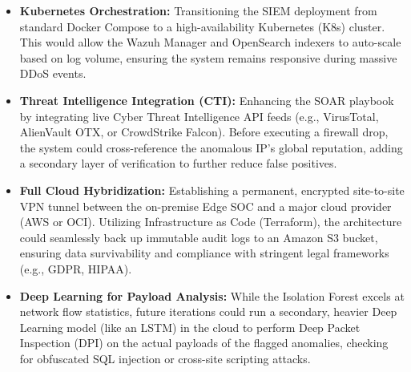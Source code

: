 \documentclass[12pt, a4paper]{report}
\begin{document}
	\begin{itemize}
		\item \textbf{Kubernetes Orchestration:} Transitioning the SIEM deployment from standard Docker Compose to a high-availability Kubernetes (K8s) cluster. This would allow the Wazuh Manager and OpenSearch indexers to auto-scale based on log volume, ensuring the system remains responsive during massive DDoS events.
		
		\item \textbf{Threat Intelligence Integration (CTI):} Enhancing the SOAR playbook by integrating live Cyber Threat Intelligence API feeds (e.g., VirusTotal, AlienVault OTX, or CrowdStrike Falcon). Before executing a firewall drop, the system could cross-reference the anomalous IP's global reputation, adding a secondary layer of verification to further reduce false positives.
		
		\item \textbf{Full Cloud Hybridization:} Establishing a permanent, encrypted site-to-site VPN tunnel between the on-premise Edge SOC and a major cloud provider (AWS or OCI). Utilizing Infrastructure as Code (Terraform), the architecture could seamlessly back up immutable audit logs to an Amazon S3 bucket, ensuring data survivability and compliance with stringent legal frameworks (e.g., GDPR, HIPAA).
		
		\item \textbf{Deep Learning for Payload Analysis:} While the Isolation Forest excels at network flow statistics, future iterations could run a secondary, heavier Deep Learning model (like an LSTM) in the cloud to perform Deep Packet Inspection (DPI) on the actual payloads of the flagged anomalies, checking for obfuscated SQL injection or cross-site scripting attacks.
	\end{itemize}
	
\end{document}
